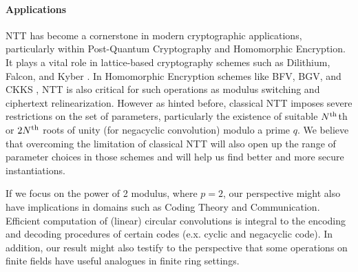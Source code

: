 \paragraph{Applications}
NTT has become a cornerstone in modern cryptographic applications, particularly within Post-Quantum Cryptography and Homomorphic Encryption. It plays a vital role in lattice-based cryptography schemes such as Dilithium, Falcon, and Kyber .  In Homomorphic Encryption schemes like BFV, BGV, and CKKS , NTT is also critical for such operations as modulus switching and ciphertext relinearization. However as hinted before, classical NTT imposes severe restrictions on the set of parameters, particularly the existence of suitable \(N\textsuperscript{th}\)th or \(2N\textsuperscript{th}\) roots of unity (for negacyclic convolution) modulo a prime \(q\). We believe that overcoming the limitation of classical NTT will also open up the range of parameter choices in those schemes and will help us find better and more secure instantiations.

If we focus on the power of 2 modulus, where \(p = 2\), our perspective might also have implications in domains such as Coding Theory and Communication. Efficient computation of (linear) circular convolutions is integral to the encoding and decoding procedures of certain codes (e.x. cyclic and negacyclic code). In addition, our result might also testify to the perspective that some operations on finite fields have useful analogues in finite ring settings.